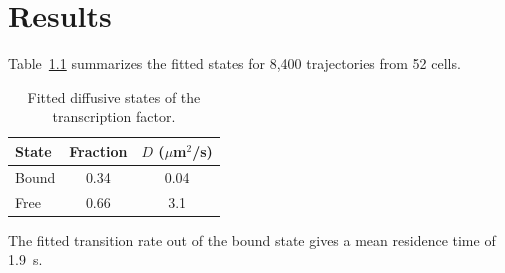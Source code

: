 \chapter{Results}
\label{ch:results}

Table~\ref{tab:states} summarizes the fitted states for 8,400 trajectories from 52 cells.

\begin{table}[htbp]
  \centering
  \caption{Fitted diffusive states of the transcription factor.}
  \label{tab:states}
  \begin{tabular}{lcc}
    \toprule
    State & Fraction & $D$ ($\mu$m$^2$/s) \\
    \midrule
    Bound & 0.34 & 0.04 \\
    Free  & 0.66 & 3.1 \\
    \bottomrule
  \end{tabular}
\end{table}

The fitted transition rate out of the bound state gives a mean residence time of 1.9~s.
